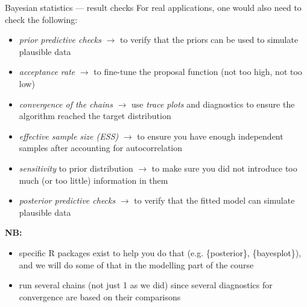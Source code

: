 \documentclass[
  ignorenonframetext,
  aspectratio=169,
  t]{beamer}
\providecommand{\tightlist}{%
  \setlength{\itemsep}{0pt}\setlength{\parskip}{0pt}}
\newcommand{\blueit}[1]{\textcolor{bluebeamer}{\emph{#1}}}
\begin{document}
\begin{frame}{Bayesian statistics --- result checks}
\protect{}\label{bayesian-statistics-result-checks}
For real applications, one would also need to check the following:

\begin{small}
\begin{itemize}
\tightlist
\item \blueit{prior predictive checks} $\rightarrow$ to verify that the priors can be used to simulate plausible data
\item \blueit{acceptance rate} $\rightarrow$ to fine-tune the proposal function (not too high, not too low)
\item \blueit{convergence of the chains} $\rightarrow$ use \blueit{trace plots} and diagnostics to ensure the algorithm reached the target distribution
\item \blueit{effective sample size (ESS)} $\rightarrow$ to ensure you have enough independent samples after accounting for autocorrelation
\item \blueit{sensitivity} to prior distribution $\rightarrow$ to make sure you did not introduce too much (or too little) information in them
\item \blueit{posterior predictive checks} $\rightarrow$ to verify that the fitted model can simulate plausible data
\end{itemize}
\end{small}

\textbf{NB:}

\begin{small}
\begin{itemize}
\tightlist
\item specific R packages exist to help you do that (e.g. \{posterior\}, \{bayesplot\}), and we will do some of that in the modelling part of the course
\item run several chains (not just 1 as we did) since several diagnostics for convergence are based on their comparisons
\end{itemize}
\end{small}
\end{frame}
\end{document}
